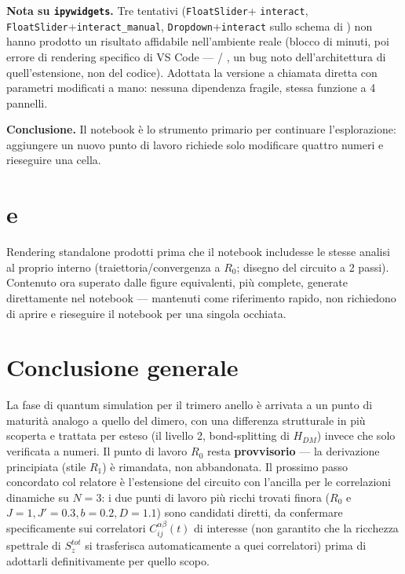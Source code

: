 \documentclass[11pt,a4paper]{article}
\begin{document}
\textbf{Nota su \texttt{ipywidgets}.} Tre tentativi (\texttt{FloatSlider}+
\texttt{interact}, \texttt{FloatSlider}+\texttt{interact\_manual},
\texttt{Dropdown}+\texttt{interact} sullo schema di
\texttt{}) non hanno prodotto un
risultato affidabile nell'ambiente reale (blocco di minuti, poi errore di rendering
specifico di VS Code — \texttt{} /
\texttt{}, un bug noto dell'architettura di
quell'estensione, non del codice). Adottata la versione a chiamata diretta con
parametri modificati a mano: nessuna dipendenza fragile, stessa funzione a 4
pannelli.

\textbf{Conclusione.} Il notebook è lo strumento primario per continuare
l'esplorazione: aggiungere un nuovo punto di lavoro richiede solo modificare quattro
numeri e rieseguire una cella.

\section*{\texttt{} e \texttt{}}

Rendering standalone prodotti prima che il notebook includesse le stesse analisi al
proprio interno (traiettoria/convergenza a $R_0$; disegno del circuito a 2 passi).
Contenuto ora superato dalle figure equivalenti, più complete, generate direttamente
nel notebook — mantenuti come riferimento rapido, non richiedono di aprire e
rieseguire il notebook per una singola occhiata.

\section*{Conclusione generale}

La fase di quantum simulation per il trimero anello è arrivata a un punto di
maturità analogo a quello del dimero, con una differenza strutturale in più
scoperta e trattata per esteso (il livello 2, bond-splitting di $H_{DM}$) invece che
solo verificata a numeri. Il punto di lavoro $R_0$ resta \textbf{provvisorio} — la
derivazione principiata (stile $R_1$) è rimandata, non abbandonata. Il prossimo
passo concordato col relatore è l'estensione del circuito con l'ancilla per le
correlazioni dinamiche su $N=3$: i due punti di lavoro più ricchi trovati finora
($R_0$ e $J{=}1,J'{=}0.3,b{=}0.2,D{=}1.1$) sono candidati diretti, da confermare
specificamente sui correlatori $C_{ij}^{\alpha\beta}(t)$ di interesse (non garantito
che la ricchezza spettrale di $S_z^{tot}$ si trasferisca automaticamente a quei
correlatori) prima di adottarli definitivamente per quello scopo.
\end{document}
